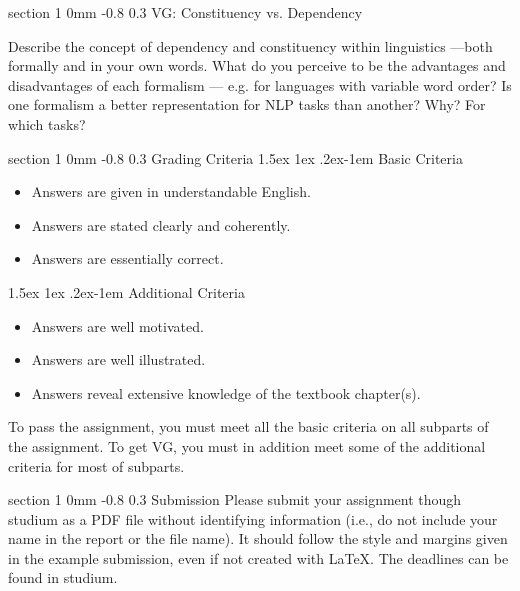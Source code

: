\documentclass[11pt]{article}
\makeatletter
\newenvironment{titlemize}[1]{%
    \paragraph{#1}
    \begin{itemize}
        \setlength\itemsep{0pt}}
    {\end{itemize}}
\renewcommand{\section}{\@startsection
{section}%
{1}%
{0mm}%
{-0.8\baselineskip}%
{0.3\baselineskip}%
{\bfseries\large}}%
\renewcommand{\paragraph}{%
  \@startsection{paragraph}{4}%
  {\z@}{1.5ex \@plus 1ex \@minus .2ex}{-1em}%
  {\normalfont\normalsize\bfseries}%
}\makeatother
\makeatother
\begin{document}
\section{VG: Constituency vs. Dependency}

Describe the concept of dependency and constituency within linguistics —both
formally and in your own words. What do you perceive to be the advantages and
disadvantages of each formalism — e.g. for languages with variable word order?
Is one formalism a better representation for NLP tasks than another? Why? For
which tasks? 

\section{Grading Criteria}
\begin{titlemize}{Basic Criteria}
    \item Answers are given in understandable English.
    \item Answers are stated clearly and coherently.
    \item Answers are essentially correct.
\end{titlemize}
\begin{titlemize}{Additional Criteria}
    \item Answers are well motivated.
    \item Answers are well illustrated.
    \item Answers reveal extensive knowledge of the textbook chapter(s).
\end{titlemize}
To pass the assignment, you must meet all the basic criteria on all subparts of the assignment. 
To get VG, you must in addition meet some of the additional criteria for most of subparts.

\section{Submission}
\noindent
Please submit your assignment though studium as a PDF file without identifying
information (i.e., do not include your name in the report or the file name). It
should follow the style and margins given in the example submission, even if
not created with LaTeX. The deadlines can be found in studium.

\end{document}
